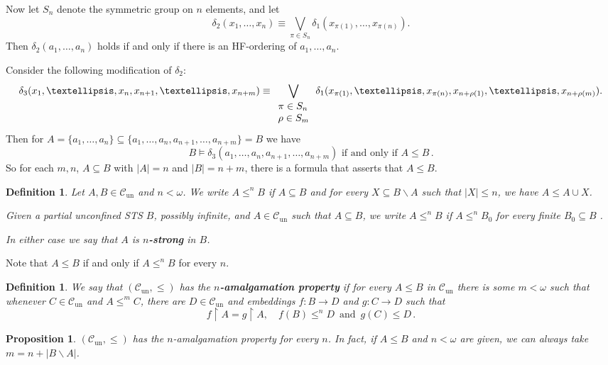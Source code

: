\documentclass[10pt,a4paper]{article}
\newcommand{\Cun}{\mathcal{C}_\mathrm{un}}
\theoremstyle{note}
\newtheorem{df}[thm]{Definition}
\newtheorem{prop}[thm]{Proposition}
\begin{document}
Now let $S_n$ denote the symmetric group on $n$ elements, and let
$$\delta_2 (x_1, \ldots, x_n) \equiv \bigvee_{\pi \in S_n} \delta_1(x_{\pi(1)}, \ldots, x_{\pi(n)}).$$
Then $\delta_2(a_1, \ldots, a_n)$ holds if and only if there is an HF-ordering of $a_1, \ldots, a_n$.

Consider the following modification of $\delta_2$:
$$\delta_3 (x_1, \ldots, x_n, x_{n+1}, \ldots , x_{n+m}) \equiv \bigvee_{\footnotesize \begin{array}{l} \pi \in S_n \\ \rho \in S_m \end{array}} \delta_1(x_{\pi(1)}, \ldots, x_{\pi(n)}, x_{n+\rho(1)}, \ldots, x_{n+\rho(m)}).$$
Then for $A=\{a_1, \ldots, a_n\} \subseteq \{a_1, \ldots, a_n, a_{n+1}, \ldots, a_{n+m}\}=B$ we have 
\[ B \models \delta_3 (a_1, \ldots, a_n, a_{n+1}, \ldots , a_{n+m}) \mbox{ if and only if } A\leq B \,. \]
So for each $m,n$, $A \subseteq B$ with  $|A|=n$ and $|B|=n+m$, there is a formula that asserts that $A \leq B$.

\begin{df}  Let $A,B\in \Cun$ and $n<\omega$.   We write  $A\leq^n B$  if  $A \subseteq B$  and for every  $X\subseteq B\smallsetminus A$  such that  $|X|\leq n$, we have  $A\leq A\cup X$. 

Given  a partial unconfined STS $B$, possibly infinite, and $A\in \Cun$ such that   $A\subseteq B$, we write  $A\leq^n B$  if $A\leq^n B_0$ for every  finite $B_0\subseteq B$ . 

In either case we say that $A$ is \textbf{$n$-strong} in $B$. 
\end{df}
Note that $A\leq B$ if and only if $A\leq^n B$  for every $n$. 

\begin{df}
	We say that $(\Cun, \leq)$  has the \textbf{$n$-amalgamation property} if  for every $A\leq B$ in $\Cun$ there is some $m<\omega$  such that whenever $C\in \Cun$ and $A\leq^m C$, there are $D\in \Cun$ and embeddings $f:B\rightarrow D$ and $g:C\rightarrow D$   such that 
$$ f\restriction A= g\restriction A, \quad f(B)\leq^n D \, \mbox{ and } \, g(C)\leq D \, .$$
\end{df}

	\begin{prop}\label{Feb_23_2024_2} $(\Cun,\leq)$ has the $n$-amalgamation property for every $n$.  In fact, if $A\leq B$ and $n<\omega$ are given, we can always take $m= n+|B\smallsetminus A|$.
	\end{prop}
\end{document}
